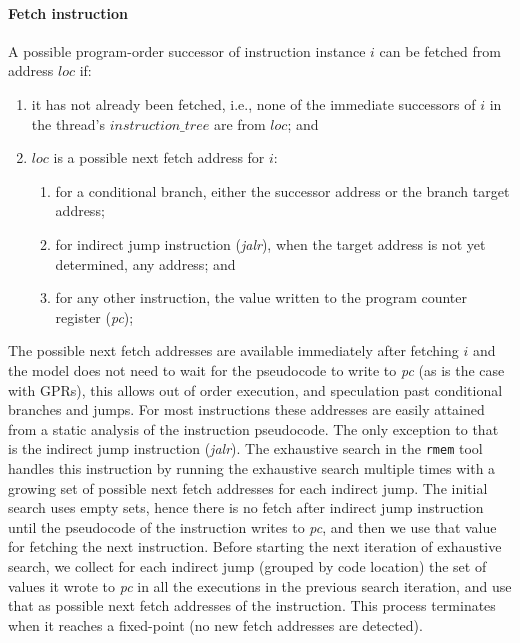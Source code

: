 \paragraph{Fetch instruction}\label{omm:thread:fetch}
A possible program-order successor of instruction instance $i$ can be fetched from address $loc$ if:
\begin{enumerate}
\item it has not already been fetched, i.e., none of the immediate successors of $i$ in the thread's $instruction\_tree$ are from $loc$; and
\item $loc$ is a possible next fetch address for $i$:
  \begin{enumerate}
  \item for a conditional branch, either the successor address or the branch target address;
  \item for indirect jump instruction ({\em jalr}), when the target address is not yet determined, any address; and
  \item for any other instruction, the value written to the program counter register ({\em pc}); 
  \end{enumerate}
\end{enumerate}

\begin{commentary}
The possible next fetch addresses are available immediately after fetching $i$ and the model does not need to wait for the pseudocode to write to {\em pc} (as is the case with GPRs), this allows out of order execution, and speculation past conditional branches and jumps.
For most instructions these addresses are easily attained from a static analysis of the instruction pseudocode.
The only exception to that is the indirect jump instruction ({\em jalr}).
%
The exhaustive search in the {\tt rmem} tool handles this instruction by running the exhaustive search multiple times with a growing set of possible next fetch addresses for each indirect jump.
The initial search uses empty sets, hence there is no fetch after indirect jump instruction until the pseudocode of the instruction writes to {\em pc}, and then we use that value for fetching the next instruction.
Before starting the next iteration of exhaustive search, we collect for each indirect jump (grouped by code location) the set of values it wrote to {\em pc} in all the executions in the previous search iteration, and use that as possible next fetch addresses of the instruction.
This process terminates when it reaches a fixed-point (no new fetch addresses are detected).
\end{commentary}


